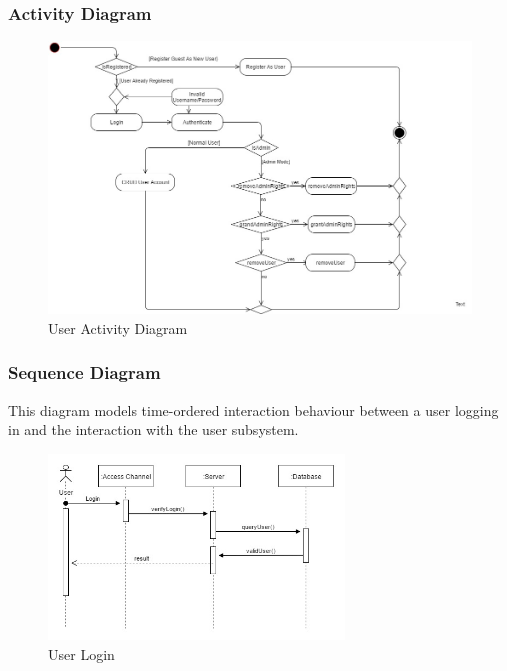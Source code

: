 %
%
%
\subsubsection{Activity Diagram}

\begin{figure}[H]
		\centering
		\includegraphics[width=\textwidth]{user/img/UserActivityDiagram.jpg}
		\caption{User Activity Diagram}
\end{figure}


\subsubsection{Sequence Diagram}
This diagram models time-ordered interaction behaviour between a user logging in and the interaction with the user subsystem.
\begin{figure}[H]
		\centering
		\includegraphics[width=0.7\textwidth]{user/img/UserSequence.jpg}
		\caption{User Login}
\end{figure}



